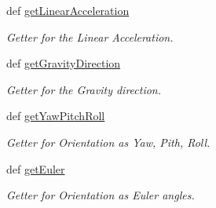 \begin{DoxyCompactItemize}
def \hyperlink{classsensor_fusion_1_1_sensor_fusion_a2f0233ea0c28bbdfd49edebbee685fe7}{get\-Linear\-Acceleration}
\begin{DoxyCompactList}\small\item\em Getter for the Linear Acceleration. \end{DoxyCompactList}\item 
def \hyperlink{classsensor_fusion_1_1_sensor_fusion_acb1010765dd0586aa77982759d15166b}{get\-Gravity\-Direction}
\begin{DoxyCompactList}\small\item\em Getter for the Gravity direction. \end{DoxyCompactList}\item 
def \hyperlink{classsensor_fusion_1_1_sensor_fusion_a72e572ae8fecffe0569afec43552c607}{get\-Yaw\-Pitch\-Roll}
\begin{DoxyCompactList}\small\item\em Getter for Orientation as Yaw, Pith, Roll. \end{DoxyCompactList}\item 
def \hyperlink{classsensor_fusion_1_1_sensor_fusion_abc7e7a71e6b944d050f177f8319400c5}{get\-Euler}
\begin{DoxyCompactList}\small\item\em Getter for Orientation as Euler angles. \end{DoxyCompactList}\end{DoxyCompactItemize}
